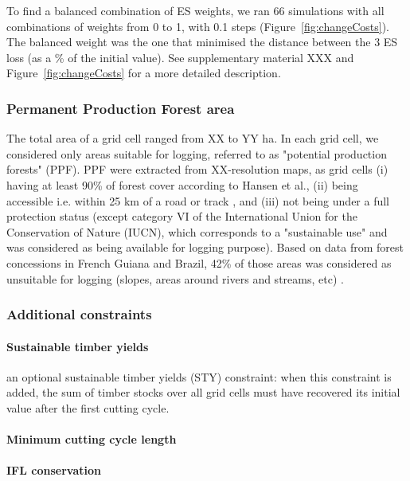 \documentclass{article}
\begin{document}
To find a balanced combination of ES weights, we ran 66 simulations with all combinations of weights from 0 to 1, with 0.1 steps (Figure~\ref{fig:changeCosts}). The balanced weight was the one that minimised the distance between the 3 ES loss (as a \% of the initial value). See supplementary material XXX and Figure~\ref{fig:changeCosts} for a more detailed description. 

\subsubsection{Permanent Production Forest area}

The total area of a grid cell ranged from XX to YY ha. In each grid cell, we considered only areas suitable for logging, referred to as "potential production forests" (PPF). PPF were extracted from XX-resolution maps, as grid cells (i) having at least 90\% of forest cover according to Hansen et al.\cite{Hansen2013}, (ii) being accessible i.e. within 25 km of a road or track \cite{OSM2018,Asner2006}, and (iii) not being under a full protection status \cite{WDPA2016} (except category VI of the International Union for the Conservation of Nature (IUCN), which corresponds to a "sustainable use" and was considered as being available for logging purpose).
Based on data from forest concessions in French Guiana and Brazil, 42\% of those areas was considered as unsuitable for logging (slopes, areas around rivers and streams, etc) \cite{Piponiotc}. 

\subsubsection{Additional constraints}

\paragraph{Sustainable timber yields}

an optional sustainable timber yields (STY) constraint: when this constraint is added, the sum of timber stocks over all grid cells must have recovered its initial value after the first cutting cycle. 

\paragraph{Minimum cutting cycle length}


\paragraph{IFL conservation}
\end{document}
